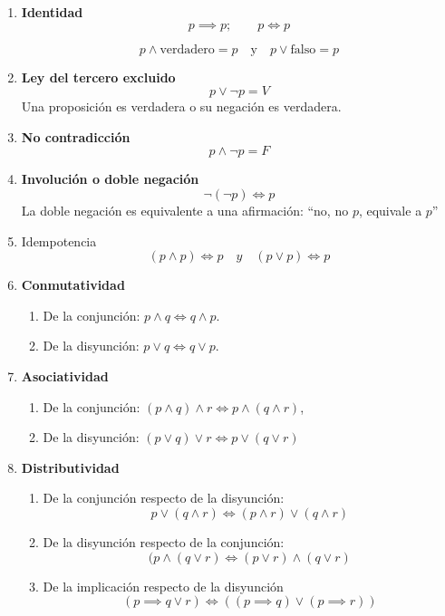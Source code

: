 \begin{enumerate}
	\item \textbf{Identidad}
	\[ p \implies p; \qquad p \iff p \]
	
	\[ p \land \mbox{verdadero} = p \quad \mbox{y} \quad p \lor \mbox{falso} = p \]
	
	\item \textbf{Ley del tercero excluido}
	\[ p \lor \neg p = V\]
	Una proposición es verdadera o su negación es verdadera.
	
	\item \textbf{No contradicción}
	\[ p \land \neg p = F \]
	
	\item \textbf{Involución o doble negación}
	\[ \neg (\neg p) \iff p \]
	La doble negación es equivalente a una afirmación: ``no, no $p$, equivale a $p$''
	\item Idempotencia
	\[ (p \land p) \iff p \quad y \quad (p \lor p) \iff p\]
	\item \textbf{Conmutatividad}
	\begin{enumerate}[label=\alph*)]
		\item De la conjunción: $p \land q \iff q \land p$. 		
		\item De la disyunción: $p \lor q \iff q \lor p$.
	\end{enumerate}
	\item \textbf{Asociatividad}
	\begin{enumerate}[label=\alph*)]
		\item De la conjunción: $(p \land q) \land r \iff p \land (q \land r)$,
		
		\item De la disyunción: $(p \lor q) \lor r \iff p \lor (q \lor r)$
	\end{enumerate}
	\item \textbf{Distributividad}
	\begin{enumerate}[label=\alph*)]
		\item De la conjunción respecto de la disyunción:
		\[ p \lor (q \land r) \iff (p \land r) \lor (q \land r) \]
		
		\item De la disyunción respecto de la conjunción:
		\[(p \land (q \lor r) \iff (p \lor r) \land (q \lor r) \]
		
		\item De la implicación respecto de la disyunción
		\[ \left( p \implies q \lor r \right) \iff \left( (p \implies q) \lor (p \implies r) \right) \]


\end{enumerate}
\end{enumerate}
